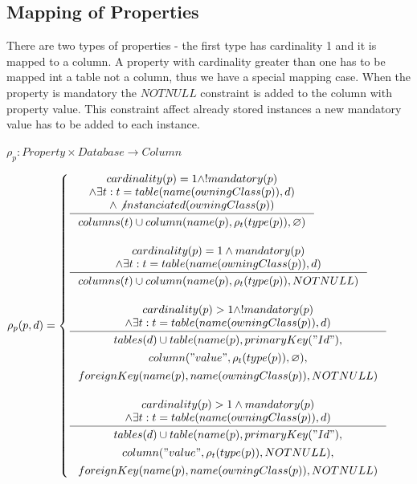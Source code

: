 \documentclass[11pt]{article}
\begin{document}
\subsection{Mapping of Properties}
There are two types of properties - the first type has cardinality 1  and it is mapped to a column. A property with cardinality greater than one has to be mapped int a table not a column, thus we have a special mapping case. When the property is mandatory the $NOTNULL$ constraint is added to the column with property value. This constraint affect already stored instances a new mandatory value has to be added to each instance.

$
\rho_p : Property \times Database \rightarrow Column 
$

$\rho_p(p, d) = \begin{cases}
  \inference{cardinality(p) = 1 \wedge ! mandatory(p)
 \\ \wedge \exists t : t = table(name(owningClass(p)), d) 
 \\ \wedge \not instanciated(owningClass(p))
 }{\begin{gathered}
	  columns(t) \cup column(name(p), \rho_t(type(p)), \varnothing )
\end{gathered}
 } \\ \\

  \inference{cardinality(p) = 1 \wedge mandatory(p)
 \\ \wedge \exists t : t = table(name(owningClass(p)), d)}{\begin{gathered}
 	 columns(t) \cup column(name(p), \rho_t(type(p)), NOTNULL ) \\
 	
 	
\end{gathered}
} 
\\ \\
 
 \inference{ cardinality(p) > 1 \wedge ! mandatory(p) \\ \wedge \exists t : t = table(name(owningClass(p)), d)}{\begin{gathered}tables(d) \cup  table(name(p), primaryKey("Id"), \\ column("value", \rho_t(type(p)), \varnothing), \\ foreignKey(name(p), name(owningClass(p)), NOTNULL) \\
 
\end{gathered}}
\\ \\

 \inference{ cardinality(p) > 1 \wedge mandatory(p) \\ \wedge \exists t : t = table(name(owningClass(p)), d) }{\begin{gathered} tables(d) \cup  table(name(p), primaryKey("Id"), \\ column("value", \rho_t(type(p)), NOTNULL), \\ foreignKey(name(p), name(owningClass(p)), NOTNULL)
	 \end{gathered}}
 \end{cases}$
\end{document}
